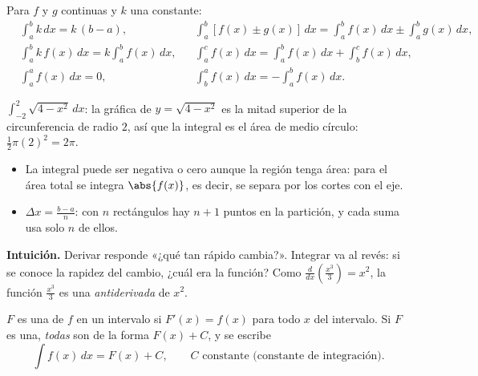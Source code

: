 \documentclass[11pt,a4paper]{article}
\newcommand{\dx}{\,dx}
\begin{document}
\begin{propiedad}
Para $f$ y $g$ continuas y $k$ una constante:
\begin{align*}
&\int_a^b k\dx=k\,(b-a), &&\int_a^b\left[f(x)\pm g(x)\right]\dx=\int_a^b f(x)\dx\pm\int_a^b g(x)\dx,\\
&\int_a^b k\,f(x)\dx=k\int_a^b f(x)\dx, &&\int_a^c f(x)\dx=\int_a^b f(x)\dx+\int_b^c f(x)\dx,\\
&\int_a^a f(x)\dx=0, &&\int_b^a f(x)\dx=-\int_a^b f(x)\dx.
\end{align*}
\end{propiedad}
\begin{ejemplo}
$\displaystyle\int_{-2}^{2}\sqrt{4-x^{2}}\dx$: la gráfica de $y=\sqrt{4-x^2}$ es la mitad superior de la circunferencia
de radio $2$, así que la integral es el área de medio círculo: $\tfrac12\pi(2)^2=2\pi$.
\end{ejemplo}
\begin{ojo}
\begin{itemize}
\item La integral puede ser negativa o cero aunque la región tenga área: para el área total se integra $\abs{f(x)}$,
      es decir, se separa por los cortes con el eje.
\item $\Delta x=\frac{b-a}{n}$: con $n$ rectángulos hay $n+1$ puntos en la partición, y cada suma usa solo $n$ de ellos.
\end{itemize}
\end{ojo}

\clearpage
{}

\textbf{Intuición.} Derivar responde «¿qué tan rápido cambia?». Integrar va al revés: si se conoce la rapidez del
cambio, ¿cuál era la función? Como $\frac{d}{dx}\left(\frac{x^3}{3}\right)=x^2$, la función $\frac{x^3}{3}$ es una
\emph{antiderivada} de $x^2$.

\begin{definicion}
$F$ es una  de $f$ en un intervalo si $F'(x)=f(x)$ para todo $x$ del intervalo.
Si $F$ es una, \emph{todas} son de la forma $F(x)+C$, y se escribe
\[ \int f(x)\dx=F(x)+C,\qquad C\text{ constante (constante de integración).} \]
\end{definicion}
\end{document}

